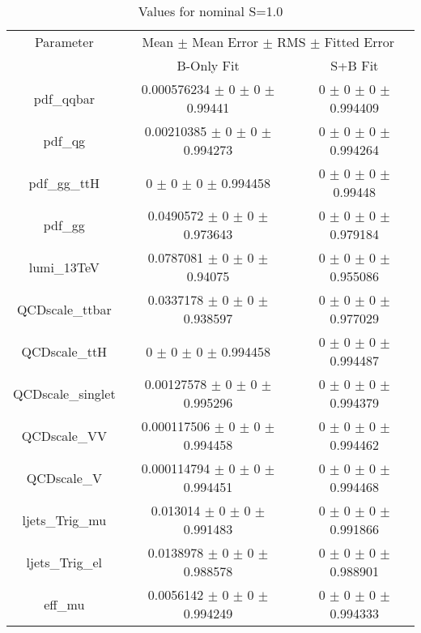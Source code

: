 \begin{table}
\centering
\caption{Values for nominal S=1.0}
\begin{tabular}{ccc}
\toprule
Parameter 	& \multicolumn{2}{c}{Mean $\pm$ Mean Error $\pm$ RMS $\pm$ Fitted Error}\\
 	& B-Only Fit & S+B Fit\\
\midrule
pdf\_qqbar 	& \num{0.000576234} $\pm$ \num{0} $\pm$ \num{0} $\pm$ \num{0.99441} 	& \num{0} $\pm$ \num{0} $\pm$ \num{0} $\pm$ \num{0.994409}\\
pdf\_qg 	& \num{0.00210385} $\pm$ \num{0} $\pm$ \num{0} $\pm$ \num{0.994273} 	& \num{0} $\pm$ \num{0} $\pm$ \num{0} $\pm$ \num{0.994264}\\
pdf\_gg\_ttH 	& \num{0} $\pm$ \num{0} $\pm$ \num{0} $\pm$ \num{0.994458} 	& \num{0} $\pm$ \num{0} $\pm$ \num{0} $\pm$ \num{0.99448}\\
pdf\_gg 	& \num{0.0490572} $\pm$ \num{0} $\pm$ \num{0} $\pm$ \num{0.973643} 	& \num{0} $\pm$ \num{0} $\pm$ \num{0} $\pm$ \num{0.979184}\\
lumi\_13TeV 	& \num{0.0787081} $\pm$ \num{0} $\pm$ \num{0} $\pm$ \num{0.94075} 	& \num{0} $\pm$ \num{0} $\pm$ \num{0} $\pm$ \num{0.955086}\\
QCDscale\_ttbar 	& \num{0.0337178} $\pm$ \num{0} $\pm$ \num{0} $\pm$ \num{0.938597} 	& \num{0} $\pm$ \num{0} $\pm$ \num{0} $\pm$ \num{0.977029}\\
QCDscale\_ttH 	& \num{0} $\pm$ \num{0} $\pm$ \num{0} $\pm$ \num{0.994458} 	& \num{0} $\pm$ \num{0} $\pm$ \num{0} $\pm$ \num{0.994487}\\
QCDscale\_singlet 	& \num{0.00127578} $\pm$ \num{0} $\pm$ \num{0} $\pm$ \num{0.995296} 	& \num{0} $\pm$ \num{0} $\pm$ \num{0} $\pm$ \num{0.994379}\\
QCDscale\_VV 	& \num{0.000117506} $\pm$ \num{0} $\pm$ \num{0} $\pm$ \num{0.994458} 	& \num{0} $\pm$ \num{0} $\pm$ \num{0} $\pm$ \num{0.994462}\\
QCDscale\_V 	& \num{0.000114794} $\pm$ \num{0} $\pm$ \num{0} $\pm$ \num{0.994451} 	& \num{0} $\pm$ \num{0} $\pm$ \num{0} $\pm$ \num{0.994468}\\
ljets\_Trig\_mu 	& \num{0.013014} $\pm$ \num{0} $\pm$ \num{0} $\pm$ \num{0.991483} 	& \num{0} $\pm$ \num{0} $\pm$ \num{0} $\pm$ \num{0.991866}\\
ljets\_Trig\_el 	& \num{0.0138978} $\pm$ \num{0} $\pm$ \num{0} $\pm$ \num{0.988578} 	& \num{0} $\pm$ \num{0} $\pm$ \num{0} $\pm$ \num{0.988901}\\
eff\_mu 	& \num{0.0056142} $\pm$ \num{0} $\pm$ \num{0} $\pm$ \num{0.994249} 	& \num{0} $\pm$ \num{0} $\pm$ \num{0} $\pm$ \num{0.994333}\\

\end{tabular}
\end{table}
